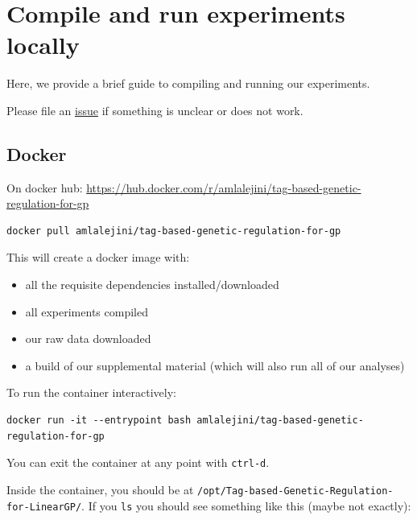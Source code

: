 \documentclass[
]{book}
\providecommand{\tightlist}{%
  \setlength{\itemsep}{0pt}\setlength{\parskip}{0pt}}
\begin{document}
\hypertarget{compile-and-run-experiments-locally}{%
\chapter{Compile and run experiments locally}\label{compile-and-run-experiments-locally}}

Here, we provide a brief guide to compiling and running our experiments.

Please file an \href{https://github.com/amlalejini/Tag-based-Genetic-Regulation-for-LinearGP/issues}{issue} if something is unclear or does not work.

\hypertarget{docker}{%
\section{Docker}\label{docker}}

On docker hub: \url{https://hub.docker.com/r/amlalejini/tag-based-genetic-regulation-for-gp}

\begin{verbatim}
docker pull amlalejini/tag-based-genetic-regulation-for-gp
\end{verbatim}

This will create a docker image with:

\begin{itemize}
\tightlist
\item
  all the requisite dependencies installed/downloaded
\item
  all experiments compiled
\item
  our raw data downloaded
\item
  a build of our supplemental material (which will also run all of our analyses)
\end{itemize}

To run the container interactively:

\begin{verbatim}
docker run -it --entrypoint bash amlalejini/tag-based-genetic-regulation-for-gp
\end{verbatim}

You can exit the container at any point with \texttt{ctrl-d}.

Inside the container, you should be at \texttt{/opt/Tag-based-Genetic-Regulation-for-LinearGP/}.
If you \texttt{ls} you should see something like this (maybe not exactly):
\end{document}
